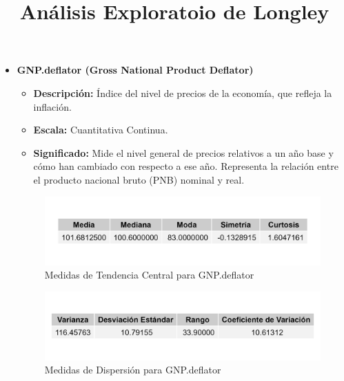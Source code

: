 \documentclass{article}
\title{Análisis Exploratoio de Longley}
\author{}
\date{}
\begin{document}
\maketitle

\begin{itemize}
    \item \textbf{GNP.deflator (Gross National Product Deflator)}
    \begin{itemize}
        \item \textbf{Descripción:} Índice del nivel de precios de la economía, que refleja la inflación.
        \item \textbf{Escala:} Cuantitativa Continua.
        \item \textbf{Significado:} Mide el nivel general de precios relativos a un año base y cómo han cambiado con respecto a ese año. Representa la relación entre el producto nacional bruto (PNB) nominal y real.
    \end{itemize}
    \begin{figure}[H]
        \centering
        \includegraphics[width=\textwidth]{MTC/GNP.deflator_central.png}
        \caption{Medidas de Tendencia Central para GNP.deflator}
    \end{figure}
    \begin{figure}[H]
        \centering
        \includegraphics[width=\textwidth]{MTC/GNP.deflator_dispersion.png}
        \caption{Medidas de Dispersión para GNP.deflator}
    \end{figure}
    

\end{itemize}
\end{document}
